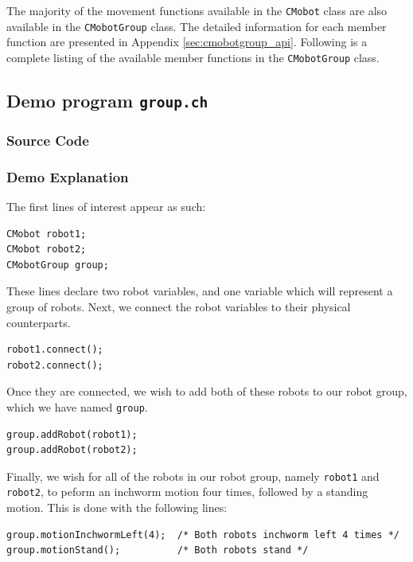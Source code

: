 \documentclass{article}
\begin{document}
The majority of the movement functions available in the \texttt{CMobot} class
are also available in the \texttt{CMobotGroup} class. 
The detailed information for each member function are presented in 
Appendix \ref{sec:cmobotgroup_api}.
 Following
is a complete listing of the available member functions in the \texttt{CMobotGroup}
class.

\vspace{8pt}
\noindent


\noindent


\subsection{Demo program \texttt{group.ch}}
\subsubsection{Source Code}


\subsubsection{Demo Explanation}
The first lines of interest appear as such:

\begin{verbatim}
CMobot robot1;
CMobot robot2;
CMobotGroup group;
\end{verbatim}

These lines declare two robot variables, and one variable which
will represent a group of robots. Next, we connect the robot
variables to their physical counterparts.

\begin{verbatim}
robot1.connect();
robot2.connect();
\end{verbatim}

Once they are connected, we wish to add both of these robots to our robot group,
which we have named \texttt{group}.

\begin{verbatim}
group.addRobot(robot1);
group.addRobot(robot2);
\end{verbatim}

Finally, we wish for all of the robots in our robot group, namely
\texttt{robot1} and \texttt{robot2}, to peform an inchworm motion four times, followed
by a standing motion. This is done with the following lines:

\begin{verbatim}
group.motionInchwormLeft(4);  /* Both robots inchworm left 4 times */
group.motionStand();          /* Both robots stand */
\end{verbatim}
\end{document}
